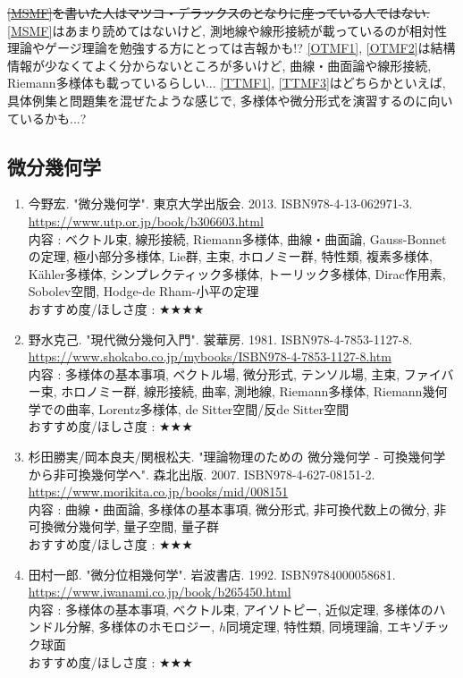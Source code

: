 \documentclass[10pt,a4paper]{jsarticle}
\begin{document}
    \sout{\ref{MSMF}を書いた人はマツコ・デラックスのとなりに座っている人ではない. }\ref{MSMF}はあまり読めてはないけど, 測地線や線形接続が載っているのが相対性理論やゲージ理論を勉強する方にとっては吉報かも!? \ref{OTMF1}, \ref{OTMF2}は結構情報が少なくてよく分からないところが多いけど, 曲線・曲面論や線形接続, Riemann多様体も載っているらしい... \ref{TTMF1}, \ref{TTMF3}はどちらかといえば, 具体例集と問題集を混ぜたような感じで, 多様体や微分形式を演習するのに向いているかも...? 
\subsection{微分幾何学}
    \begin{enumerate}
        \renewcommand{\theenumi}{[DG\arabic{enumi}]}
        \renewcommand{\labelenumi}{\theenumi}
        \setcounter{enumi}{0}
        \item \label{KHDG} 今野宏. "微分幾何学". 東京大学出版会. 2013. ISBN978-4-13-062971-3. \\
        \url{https://www.utp.or.jp/book/b306603.html} \\
        内容 : ベクトル束, 線形接続, Riemann多様体, 曲線・曲面論, Gauss-Bonnetの定理, 極小部分多様体, Lie群, 主束, ホロノミー群, 特性類, 複素多様体, Kähler多様体, シンプレクティック多様体, トーリック多様体, Dirac作用素, Sobolev空間, Hodge-de Rham-小平の定理\\
        おすすめ度/ほしさ度 : $\bigstar \bigstar \bigstar \bigstar $
        \item \label{NKDG} 野水克己. "現代微分幾何入門". 裳華房. 1981. ISBN978-4-7853-1127-8. \\
        \url{https://www.shokabo.co.jp/mybooks/ISBN978-4-7853-1127-8.htm} \\
        内容 : 多様体の基本事項, ベクトル場, 微分形式, テンソル場, 主束, ファイバー束, ホロノミー群, 線形接続, 曲率, 測地線, Riemann多様体, Riemann幾何学での曲率, Lorentz多様体, de Sitter空間/反de Sitter空間\\
        おすすめ度/ほしさ度 : $\bigstar \bigstar \bigstar $
        \item \label{SOKDG} 杉田勝実/岡本良夫/関根松夫. "理論物理のための 微分幾何学 - 可換幾何学から非可換幾何学へ". 森北出版. 2007. ISBN978-4-627-08151-2. \\
        \url{https://www.morikita.co.jp/books/mid/008151} \\
        内容 : 曲線・曲面論, 多様体の基本事項, 微分形式, 非可換代数上の微分, 非可換微分幾何学, 量子空間, 量子群\\
        おすすめ度/ほしさ度 : $\bigstar \bigstar \bigstar $
        \item \label{TIDG} 田村一郎. "微分位相幾何学". 岩波書店. 1992. ISBN9784000058681. \\
        \url{https://www.iwanami.co.jp/book/b265450.html} \\
        内容 : 多様体の基本事項, ベクトル束, アイソトピー, 近似定理, 多様体のハンドル分解, 多様体のホモロジー, $h$同境定理, 特性類, 同境理論, エキゾチック球面\\
        おすすめ度/ほしさ度 : $\bigstar \bigstar \bigstar $
    \end{enumerate}\par
\end{document}
